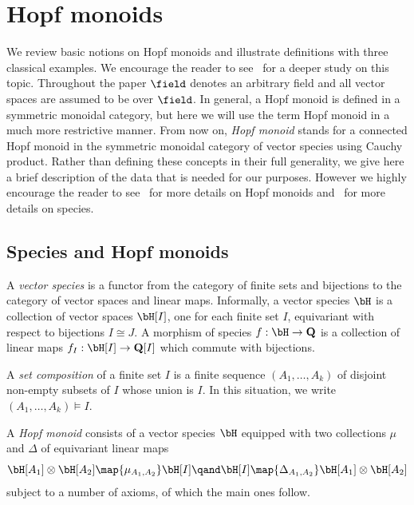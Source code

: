 \section{Hopf monoids}\label{s:hopf}


We review basic notions on Hopf monoids and illustrate definitions with three classical examples. We encourage the reader to see~\cite{AM:2010} for a deeper study on this topic. Throughout the paper $\field$ denotes an arbitrary field and all vector spaces are assumed to be over $\field$. 
In general, a Hopf monoid is defined in a symmetric monoidal category, but here we will use the term {Hopf monoid} in a much more
restrictive manner. From now on, \emph{Hopf monoid} stands for a connected Hopf monoid in the symmetric monoidal category of vector species using Cauchy product. Rather than defining these concepts in their full generality, we give here a brief description of the data that is needed for our purposes. However we highly encourage the reader to see~\cite{AM:2010} for more details on Hopf monoids and~\cite{species98} for more details on species.


\subsection{Species and Hopf monoids}\label{ss:sp-hopf}
A \emph{vector species} is a functor from the category of finite sets and bijections to the category of vector spaces and linear maps. Informally, a {vector species} $\bH$ is a collection of vector spaces $\bH[I]$,
one for each finite set $I$, equivariant with respect to bijections $I\cong J$.
A morphism of species $f:\bH\to\mathbf{Q}$ is a collection of linear maps
$f_I:\bH[I]\to{\mathbf{Q}}[I]$ which commute with bijections.

A \emph{set composition} of a finite set $I$ is a finite sequence $(A_1,\ldots,A_k)$
of disjoint non-empty subsets of $I$ whose union is $I$. In this situation, we write
$
(A_1,\ldots,A_k)\models I.
$

A \emph{Hopf monoid} consists of a vector species $\bH$
equipped with two collections $\mu$ and $\Delta$ of equivariant linear maps
\[
\bH[A_1]\otimes\bH[A_2] \map{\mu_{A_1,A_2}}\bH[I]
\qand
\bH[I]\map{\Delta_{A_1,A_2}} \bH[A_1]\otimes\bH[A_2]
\]
subject to a number of axioms, of which the main ones follow.

